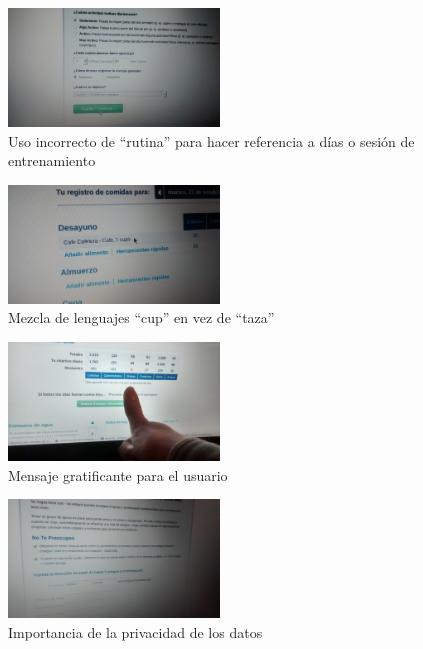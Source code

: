 \documentclass[a4paper]{article}
\begin{document}
			\begin{figure}[!h]
				\centering
				\includegraphics[width=0.5\textwidth]{./figuras/marta1.jpg}
				\caption{Uso incorrecto de ``rutina'' para hacer referencia a días o sesión de entrenamiento}
			\end{figure}
			\begin{figure}[!h]
				\centering
				\includegraphics[width=0.5\textwidth]{./figuras/marta2.jpg}
				\caption{Mezcla de lenguajes ``cup'' en vez de ``taza''}
			\end{figure}
			\begin{figure}[!h]
				\centering
				\includegraphics[width=0.5\textwidth]{./figuras/marta3.jpg}
				\caption{Mensaje gratificante para el usuario}
			\end{figure}
			\begin{figure}[!h]
				\centering
				\includegraphics[width=0.5\textwidth]{./figuras/marta4.jpg}
				\caption{Importancia de la privacidad de los datos}
			\end{figure}
		\FloatBarrier
		
\end{document}
